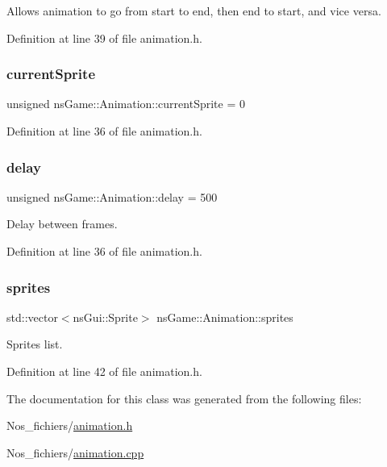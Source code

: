 Allows animation to go from start to end, then end to start, and vice versa. 



Definition at line 39 of file animation.\+h.

\mbox{\label{classns_game_1_1_animation_a2cb68d312de6b044102c6a1e65221eb3}} 
\subsubsection{\texorpdfstring{current\+Sprite}{currentSprite}}
{\footnotesize\ttfamily unsigned ns\+Game\+::\+Animation\+::current\+Sprite = 0}



Definition at line 36 of file animation.\+h.

\mbox{\label{classns_game_1_1_animation_abde2f282d6d865a253f0a6edc0964508}} 
\subsubsection{\texorpdfstring{delay}{delay}}
{\footnotesize\ttfamily unsigned ns\+Game\+::\+Animation\+::delay = 500}



Delay between frames. 



Definition at line 36 of file animation.\+h.

\mbox{\label{classns_game_1_1_animation_a1757a8a9ce0a3fc6a75b1289b78753bb}} 
\subsubsection{\texorpdfstring{sprites}{sprites}}
{\footnotesize\ttfamily std\+::vector$<$ns\+Gui\+::\+Sprite$>$ ns\+Game\+::\+Animation\+::sprites}



Sprites list. 



Definition at line 42 of file animation.\+h.



The documentation for this class was generated from the following files\+:\begin{DoxyCompactItemize}
\item 
Nos\+\_\+fichiers/\hyperlink{animation_8h}{animation.\+h}\item 
Nos\+\_\+fichiers/\hyperlink{animation_8cpp}{animation.\+cpp}\end{DoxyCompactItemize}

